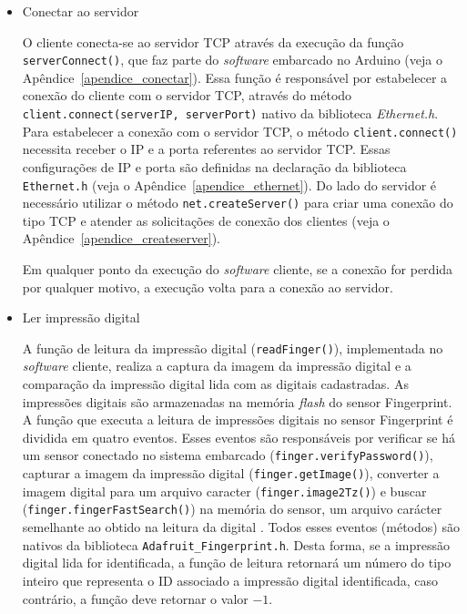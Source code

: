   \begin{itemize}
      \item Conectar ao servidor
      
      \begin{sloppypar}
      O cliente conecta-se ao servidor TCP através da execução da função \texttt{serverConnect()}, que faz parte do \textit{software} embarcado no Arduino (veja o Apêndice~\ref{apendice_conectar}). Essa função é responsável por estabelecer a conexão do cliente com o servidor TCP, através do método \texttt{client.connect(serverIP, serverPort)} nativo da biblioteca \textit{Ethernet.h}. Para estabelecer a conexão com o servidor TCP, o método \texttt{client.connect()} necessita receber o IP e a porta referentes ao servidor TCP. Essas configurações de IP e porta são definidas na declaração da biblioteca \texttt{Ethernet.h} (veja o Apêndice~\ref{apendice_ethernet}). Do lado do servidor é necessário utilizar o método \texttt{net.createServer()} para criar uma conexão do tipo TCP e atender as solicitações de conexão dos clientes (veja o Apêndice~\ref{apendice_createserver}).
      \end{sloppypar}
      
      Em qualquer ponto da execução do \textit{software} cliente, se a conexão for perdida por qualquer motivo, a execução volta para a conexão ao servidor.
      
      \item Ler impressão digital
      \begin{sloppypar}
      A função de leitura da impressão digital (\texttt{readFinger()}), implementada no \mbox{\textit{software}} cliente, realiza a captura da imagem da impressão digital e a comparação da impressão digital lida com as digitais cadastradas. As impressões digitais são armazenadas na memória \textit{flash} do sensor Fingerprint. A função que executa a leitura de impressões digitais no sensor Fingerprint é dividida em quatro eventos. \mbox{Esses} eventos são responsáveis por verificar se há um sensor conectado no sistema embarcado (\texttt{finger.verifyPassword()}), capturar a imagem da impressão digital (\texttt{finger.getImage()}), converter a imagem digital para um arquivo caracter (\texttt{finger.image2Tz()}) e buscar (\texttt{finger.fingerFastSearch()}) na memória do sensor, um arquivo carácter semelhante ao obtido na leitura da digital \cite{zfm-20}. Todos esses eventos (métodos) são nativos da biblioteca \texttt{Adafruit\_Fingerprint.h}. Desta forma, se a impressão digital lida for identificada, a função de leitura retornará um número do tipo inteiro que representa o ID associado a impressão digital identificada, caso contrário, a função deve retornar o valor $-1$.  
      \end{sloppypar}
      

\end{itemize}
